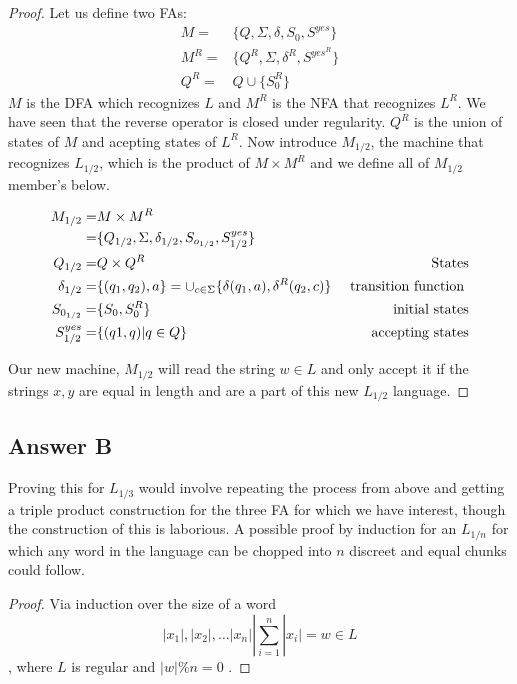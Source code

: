 \documentclass[titlepage]{article}\usepackage[]{graphicx}\usepackage[]{color}
\begin{document}
\begin{proof}
	Let us define two FAs:
	\begin{align}
		M =& \{Q, \Sigma, \delta, S_0, S^{yes}\} \\
		M^R =& \{ Q^R, \Sigma, \delta^R, S^{yes^R} \} \\
		Q^R = & Q \cup \{S_{0}^R \}
	\end{align}
	$M$ is the DFA which recognizes $L$ and $M^R$ is the NFA that recognizes
	$L^R$. We have seen that the reverse operator is closed under
	regularity. $Q^R$ is the union of states of $M$ and acepting states of
	$L^R$.
        Now introduce $M_{1/2}$, the machine that recognizes $L_{1/2}$, which
        is the product of $M \times M^R$ and we define all of $M_{1/2}$
        member's below.
        
        \begin{align}
          M_{1/2} = & M \times M^R \\ = &  \{ Q_{1/2}, \Sigma, \delta_{1/2}, S_{o_{1/2}}, S_{1/2}^{yes}  \} & \\
          Q_{1/2} = & Q \times Q^R \hfill & \text{States} \\ 
          \delta_{1/2} = & \{ (q_1, q_2), a\} = \cup_{c \in \Sigma} \{ \delta (q_1, a), \delta^R (q_2, c)\} &\text{ transition function }\\ 
          S_{0_{1/2}} = & \{ S_0, S_0^R \} & \text{ initial states} \\
          S^{yes}_{1/2} = & \{ (q1,q) | q \in Q \} & \text{ accepting states}
	\end{align}

        Our new machine, $M_{1/2}$ will read the string $w \in L$ and only
        accept it if the strings $x,y$ are equal in length and are a part of
        this new $L_{1/2}$ language. 
\end{proof}

\subsection{Answer B}
Proving this for $L_{1/3}$ would involve repeating the process from above and
getting a triple product construction for the three FA for which we have
interest, though the construction of this is laborious. 
A possible proof by induction for an $L_{1/n}$ for which any word in the
language can be chopped into $n$ discreet and equal chunks could follow. 

\begin{proof}
  Via induction over the size of a word 
  \[ |x_1|, |x_2|, \dots |x_n| | \sum_{i=1}^n |x_i| = w \in L \]
  , where $L$ is regular and $|w|\%n=0 $ .

\end{proof}
\end{document}
